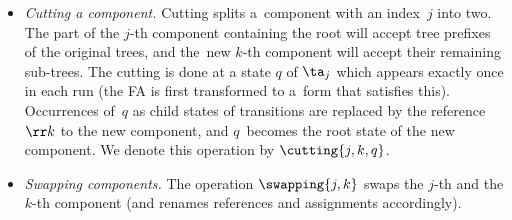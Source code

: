 \begin{itemize}
\item \emph{Cutting a component.}
Cutting splits a~component with an index~$j$ into two. 
The part of the $j$-th component containing the root will accept tree prefixes
of the original trees, and the~new $k$-th component will accept their remaining
sub-trees.
The cutting is done at a state $q$ of $\ta_j$ which appears exactly once in
each run (the FA is first transformed to a~form that satisfies this). 
Occurrences of~$q$ as child states of transitions are replaced by the
reference~$\rr k$ to the new component, and $q$~becomes the root state of the new
component. 
We denote this operation by $\cutting{j,k,q}$.
\item \emph{Swapping components.}
  The operation $\swapping{j,k}$ swaps the
  $j$-th and the $k$-th component (and renames references and assignments
  accordingly). 
\end{itemize}

